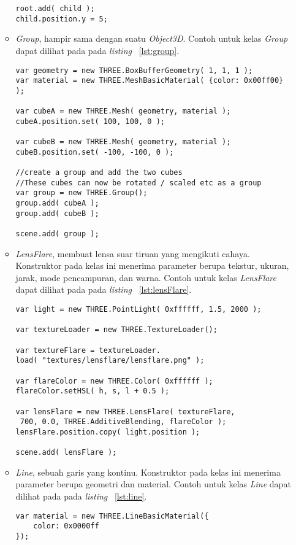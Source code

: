 \begin{itemize}
\begin{itemize}
\begin{lstlisting}[caption={Contoh penggunaan kelas {\it Bone}.}, label={lst:bone},captionpos=b]
root.add( child );
child.position.y = 5;
\end{lstlisting}
		\item {\it Group}, hampir sama dengan suatu {\it Object3D}. Contoh untuk kelas {\it Group} dapat dilihat pada pada {\it listing} ~\ref{lst:group}.
\begin{lstlisting}[caption={Contoh penggunaan kelas {\it Group}.}, label={lst:group},captionpos=b]
var geometry = new THREE.BoxBufferGeometry( 1, 1, 1 );
var material = new THREE.MeshBasicMaterial( {color: 0x00ff00} );

var cubeA = new THREE.Mesh( geometry, material );
cubeA.position.set( 100, 100, 0 );

var cubeB = new THREE.Mesh( geometry, material );
cubeB.position.set( -100, -100, 0 );

//create a group and add the two cubes
//These cubes can now be rotated / scaled etc as a group
var group = new THREE.Group();
group.add( cubeA );
group.add( cubeB );

scene.add( group );
\end{lstlisting}
		\item {\it LensFlare}, membuat lensa suar tiruan yang mengikuti cahaya. Konstruktor pada kelas ini menerima parameter berupa tekstur, ukuran, jarak, mode pencampuran, dan warna. Contoh untuk kelas {\it LensFlare} dapat dilihat pada pada {\it listing} ~\ref{lst:lensFlare}.
\begin{lstlisting}[caption={Contoh penggunaan kelas {\it LensFlare}.}, label={lst:lensFlare},captionpos=b]
var light = new THREE.PointLight( 0xffffff, 1.5, 2000 );

var textureLoader = new THREE.TextureLoader();

var textureFlare = textureLoader.
load( "textures/lensflare/lensflare.png" );

var flareColor = new THREE.Color( 0xffffff );
flareColor.setHSL( h, s, l + 0.5 );

var lensFlare = new THREE.LensFlare( textureFlare,
 700, 0.0, THREE.AdditiveBlending, flareColor );
lensFlare.position.copy( light.position );

scene.add( lensFlare );
\end{lstlisting}
		\item {\it Line}, sebuah garis yang kontinu. Konstruktor pada kelas ini menerima parameter berupa geometri dan material. Contoh untuk kelas {\it Line} dapat dilihat pada pada {\it listing} ~\ref{lst:line}.
\begin{lstlisting}[caption={Contoh penggunaan kelas {\it Line}.}, label={lst:line},captionpos=b]
var material = new THREE.LineBasicMaterial({
	color: 0x0000ff
});


\end{lstlisting}
\end{itemize}
\end{itemize}

